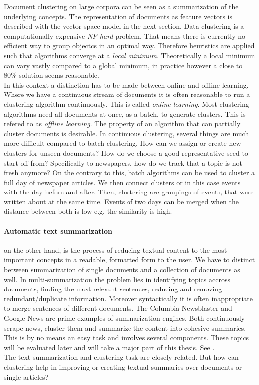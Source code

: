   Document clustering on large corpora can be seen as a summarization of the underlying concepts. The representation of documents as feature vectors is described with the vector space model in the next section. Data clustering is a computationally expensive \emph{NP-hard} problem. That means there is currently no efficient way to group objectcs in an optimal way. Therefore heuristics are applied such that algorithms converge at a  \emph{local minimum}. Theoretically a local minimum can vary vastly compared to a global minimum, in practice however a close to 80\% solution seems reasonable.\\ 
  In this context a distinction has to be made between online and offline learning. Where we have a continuous stream of documents it is often reasonable to run a clustering algorithm continuously. This is called \emph{online learning}. Most clustering algorithms need all documents at once, as a batch, to generate clusters. This is refered to as \emph{offline learning}. The property of an algorithm that can partially cluster documents is desirable. In continuous clustering, several things are much more difficult compared to batch clustering. How can we assign or create new clusters for unseen documents? How do we choose a good representative seed to start off from? Specifically to newspapers, how do we track that a topic is not fresh anymore? On the contrary to this, batch algorithms can be used to cluster a full day of newspaper articles. We then connect clusters or in this case events with the day before and after. Then, clustering are groupings of events, that were written about at the same time. Events of two days can be merged when the distance between both is low e.g. the similarity is high.

  \paragraph{Automatic text summarization} on the other hand, is the process of reducing textual content to the most important concepts in a readable, formatted form to the user. \cite{SumEvaluation2001} We have to distinct between summarization of single documents and a collection of documents as well. In multi-summarization the problem lies in identifying topics accross documents, finding the most relevant sentences, reducing and removing redundant/duplicate information. Moreover syntactically it is often inappropriate to merge sentences of different documents. The Columbia Newsblaster and Google News are prime examples of summarization engines. Both continuously scrape news, cluster them and summarize the content into cohesive summaries. This is by no means an easy task and involves several components. These topics will be evaluated later and will take a major part of this thesis. See \cite{NewsBlaster2002, ColumbiaExperimentsSum2002}.\\
  The text summarization and clustering task are closely related. But how can clustering help in improving or creating textual summaries over documents or single articles?
  
